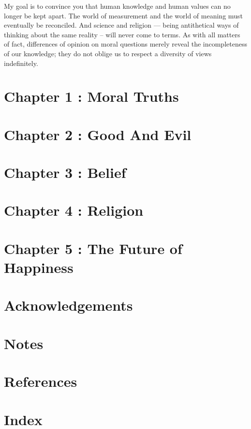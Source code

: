\documentclass[a4paper,12pt]{extbook}
\begin{document}
My goal is to convince you that human knowledge and human values can no longer be kept apart. 
The world of measurement and the world of meaning must eventually be reconciled. 
And science and religion --- being antithetical ways of thinking about the same reality -- will never come to terms. 
As with all matters of fact, differences of opinion on moral questions merely reveal the incompleteness of our knowledge; 
they do not oblige us to respect a diversity of views indefinitely. 

\newpage
\section{Chapter 1 : Moral Truths}

\newpage
\section{Chapter 2 : Good And Evil}

\newpage
\section{Chapter 3 : Belief}

\newpage
\section{Chapter 4 : Religion}

\newpage
\section{Chapter 5 : The Future of Happiness}

\newpage
\section{Acknowledgements}

\newpage
\section{Notes}

\newpage
\section{References}

\newpage
\section{Index}
\end{document}
